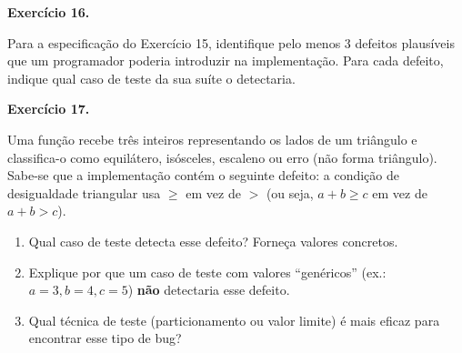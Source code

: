 \documentclass[12pt,a4paper]{article}
\newif\ifgabarito
\newcommand{\questao}[2][8]{%
  \needspace{#1\baselineskip}%
  \noindent\textbf{Exercício #2.}%
}
\begin{document}
\vspace{8pt}

\questao[5]{16}
Para a especificação do Exercício 15, identifique pelo menos 3 defeitos plausíveis que um programador poderia introduzir na implementação. Para cada defeito, indique qual caso de teste da sua suíte o detectaria.

\ifgabarito
\begin{tcolorbox}[gabarito]
\begin{enumerate}[label=(\arabic*),nosep]
  \item Usar $>$ em vez de $\geq$ na verificação do domínio de \texttt{valor} ($\texttt{valor} > 0$): detectado por T08 (\texttt{valor}$=0{,}01$ deve retornar 0, não $-1$).
  \item Omitir o cap de 25\%: detectado por T06 (VIP+cupom deveria retornar 25,00 e não 26,00).
  \item Inverter percentuais por tipo (ex.: normal recebe 10\%): detectado por T01 (deve retornar 0,00) e T03 (deve retornar 10,00).
\end{enumerate}
\end{tcolorbox}
\fi

\vspace{8pt}

\questao[9]{17}
Uma função recebe três inteiros representando os lados de um triângulo e classifica-o como equilátero, isósceles, escaleno ou erro (não forma triângulo). Sabe-se que a implementação contém o seguinte defeito: a condição de desigualdade triangular usa $\geq$ em vez de $>$ (ou seja, $a + b \geq c$ em vez de $a + b > c$).
\begin{enumerate}[label=\alph*)]
  \item Qual caso de teste detecta esse defeito? Forneça valores concretos.
  \item Explique por que um caso de teste com valores ``genéricos'' (ex.: $a=3, b=4, c=5$) \textbf{não} detectaria esse defeito.
  \item Qual técnica de teste (particionamento ou valor limite) é mais eficaz para encontrar esse tipo de bug?
\end{enumerate}

\ifgabarito
\begin{tcolorbox}[gabarito]
\begin{enumerate}[label=\alph*),nosep]
  \item CT: $a=3, b=4, c=7$. Com $\geq$: $3+4 \geq 7$ (verdadeiro --- aceita como triângulo, incorreto). Com $>$: $3+4 \not> 7$ (falso --- retorna erro, correto). O CT detecta o defeito.
  \item $a=3,b=4,c=5$: $3+4=7 > 5$ --- ambas as condições ($>$ e $\geq$) produzem o mesmo resultado (aceita), portanto o bug não é exercido.
  \item \textbf{Valor limite} (\textit{boundary value analysis}): o defeito reside exatamente na fronteira da desigualdade triangular ($a+b = c$).
\end{enumerate}
\end{tcolorbox}
\fi
\end{document}
